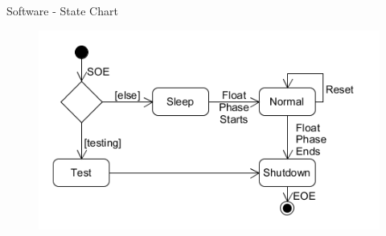 \documentclass[11pt, aspectratio=169]{beamer}
\begin{document}
    \begin{frame}[c]{Software - State Chart}
        \centering
        \begin{figure}
            \includegraphics[width=.7\textwidth]{software/state-diagram.png}
        \end{figure}
    \end{frame}
\end{document}
